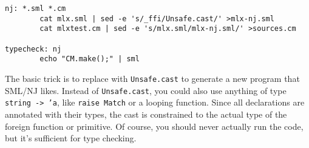 \begin{verbatim}
nj: *.sml *.cm
        cat mlx.sml | sed -e 's/_ffi/Unsafe.cast/' >mlx-nj.sml
        cat mlxtest.cm | sed -e 's/mlx.sml/mlx-nj.sml/' >sources.cm

typecheck: nj
        echo "CM.make();" | sml
\end{verbatim}

The basic trick is to replace {\ffi} with {\tt Unsafe.cast} to generate a new
program that SML/NJ likes.  Instead of {\tt Unsafe.cast}, you could also use
anything of type {\tt string -> 'a}, like {\tt raise Match} or a looping
function.  Since all {\ffi} declarations are annotated with their types, the
cast is constrained to the actual type of the foreign function or primitive. Of
course, you should never actually run the code, but it's sufficient for type
checking.
